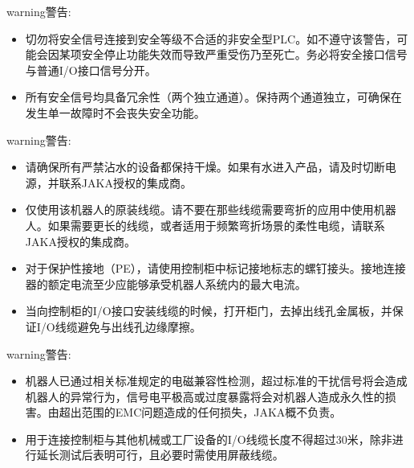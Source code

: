 \documentclass[a4paper,11pt,english,openany,oneside]{sphinxmanual}
\begin{document}
\begin{sphinxadmonition}{warning}{警告:}\begin{itemize}
\item {} 
\sphinxAtStartPar
切勿将安全信号连接到安全等级不合适的非安全型PLC。如不遵守该警告，可能会因某项安全停止功能失效而导致严重受伤乃至死亡。务必将安全接口信号与普通I/O接口信号分开。

\item {} 
\sphinxAtStartPar
所有安全信号均具备冗余性（两个独立通道）。保持两个通道独立，可确保在发生单一故障时不会丧失安全功能。

\end{itemize}
\end{sphinxadmonition}

\begin{sphinxadmonition}{warning}{警告:}\begin{itemize}
\item {} 
\sphinxAtStartPar
请确保所有严禁沾水的设备都保持干燥。如果有水进入产品，请及时切断电源，并联系JAKA授权的集成商。

\item {} 
\sphinxAtStartPar
仅使用该机器人的原装线缆。请不要在那些线缆需要弯折的应用中使用机器人。如果需要更长的线缆，或者适用于频繁弯折场景的柔性电缆，请联系JAKA授权的集成商。

\item {} 
\sphinxAtStartPar
对于保护性接地（PE），请使用控制柜中标记接地标志的螺钉接头。接地连接器的额定电流至少应能够承受机器人系统内的最大电流。

\item {} 
\sphinxAtStartPar
当向控制柜的I/O接口安装线缆的时候，打开柜门，去掉出线孔金属板，并保证I/O线缆避免与出线孔边缘摩擦。

\end{itemize}
\end{sphinxadmonition}

\begin{sphinxadmonition}{warning}{警告:}\begin{itemize}
\item {} 
\sphinxAtStartPar
机器人已通过相关标准规定的电磁兼容性检测，超过标准的干扰信号将会造成机器人的异常行为，信号电平极高或过度暴露将会对机器人造成永久性的损害。由超出范围的EMC问题造成的任何损失，JAKA概不负责。

\item {} 
\sphinxAtStartPar
用于连接控制柜与其他机械或工厂设备的I/O线缆长度不得超过30米，除非进行延长测试后表明可行，且必要时需使用屏蔽线缆。

\end{itemize}
\end{sphinxadmonition}
\end{document}
